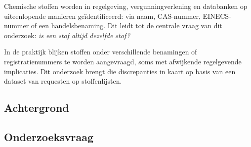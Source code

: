 Chemische stoffen worden in regelgeving, vergunningverlening en databanken
op uiteenlopende manieren geïdentificeerd: via naam, CAS-nummer, EINECS-nummer
of een handelsbenaming. Dit leidt tot de centrale vraag van dit onderzoek:
\emph{is een stof altijd dezelfde stof?}

In de praktijk blijken stoffen onder verschillende benamingen of
registratienummers te worden aangevraagd, soms met afwijkende regelgevende
implicaties. Dit onderzoek brengt die discrepanties in kaart op basis van een
dataset van requesten op stoffenlijsten.

\subsection{Achtergrond}

\subsection{Onderzoeksvraag}
